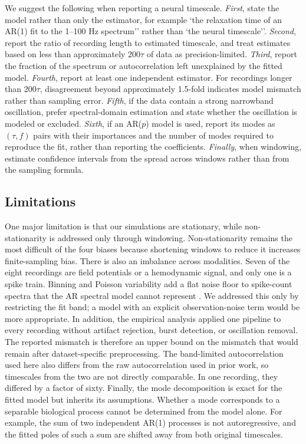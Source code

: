 \documentclass[pdflatex,lineno,sn-nature]{sn-jnl}
\theoremstyle{thmstyleone}
\theoremstyle{thmstyletwo}
\theoremstyle{thmstylethree}
\begin{document}
We suggest the following when reporting a neural timescale. \textit{First}, state the model rather than only the estimator, for example `the relaxation time of an AR(1) fit to the 1--100 Hz spectrum'' rather than `the neural timescale''. \textit{Second}, report the ratio of recording length to estimated timescale, and treat estimates based on less than approximately $200\tau$ of data as precision-limited. \textit{Third}, report the fraction of the spectrum or autocorrelation left unexplained by the fitted model. \textit{Fourth}, report at least one independent estimator. For recordings longer than $200\tau$, disagreement beyond approximately 1.5-fold indicates model mismatch rather than sampling error. \textit{Fifth}, if the data contain a strong narrowband oscillation, prefer spectral-domain estimation and state whether the oscillation is modeled or excluded. \textit{Sixth}, if an AR($p$) model is used, report its modes as $(\tau, f)$ pairs with their importances and the number of modes required to reproduce the fit, rather than reporting the coefficients. \textit{Finally}, when windowing, estimate confidence intervals from the spread across windows rather than from the sampling formula.

\subsection{Limitations}

One major limitation is that our simulations are stationary, while non-stationarity is addressed only through windowing. Non-stationarity remains the most difficult of the four biases because shortening windows to reduce it increases finite-sampling bias. There is also an imbalance across modalities. Seven of the eight recordings are field potentials or a hemodynamic signal, and only one is a spike train. Binning and Poisson variability add a flat noise floor to spike-count spectra that the AR spectral model cannot represent \cite{zeraati_flexible_2022, meyer_inferring_2019}. We addressed this only by restricting the fit band; a model with an explicit observation-noise term would be more appropriate. In addition, the empirical analysis applied one pipeline to every recording without artifact rejection, burst detection, or oscillation removal. The reported mismatch is therefore an upper bound on the mismatch that would remain after dataset-specific preprocessing. The band-limited autocorrelation used here also differs from the raw autocorrelation used in prior work, so timescales from the two are not directly comparable. In one recording, they differed by a factor of sixty. Finally, the mode decomposition is exact for the fitted model but inherits its assumptions. Whether a mode corresponds to a separable biological process cannot be determined from the model alone. For example, the sum of two independent AR(1) processes is not autoregressive, and the fitted poles of such a sum are shifted away from both original timescales.
\end{document}
